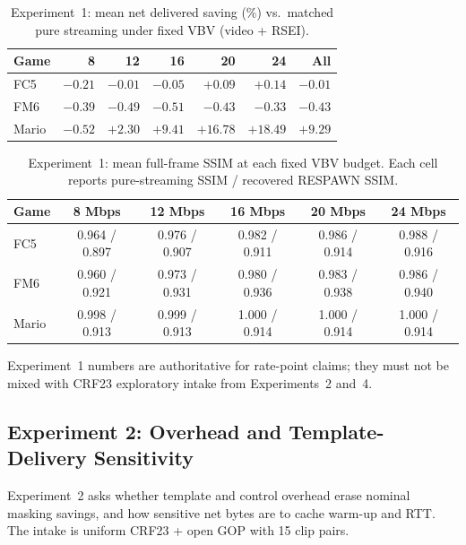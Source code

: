 \begin{table}[t]
  \centering
  \small
  \caption{Experiment~1: mean net delivered saving (\%) vs.\ matched pure streaming under fixed VBV (video + RSEI).}
  \label{tab:exp1-fixed-budget}
  \setlength{\tabcolsep}{4pt}
  \begin{tabular}{@{}lrrrrrr@{}}
    \toprule
    \textbf{Game} & \textbf{8} & \textbf{12} & \textbf{16} & \textbf{20} & \textbf{24} & \textbf{All} \\
    \midrule
    FC5  & $-0.21$ & $-0.01$ & $-0.05$ & $+0.09$ & $+0.14$ & $\mathbf{-0.01}$ \\
    FM6  & $-0.39$ & $-0.49$ & $-0.51$ & $-0.43$ & $-0.33$ & $\mathbf{-0.43}$ \\
    Mario & $-0.52$ & $+2.30$ & $+9.41$ & $+16.78$ & $+18.49$ & $\mathbf{+9.29}$ \\
    \bottomrule
  \end{tabular}
\end{table}

\begin{table}[t]
  \centering
  \small
  \caption{Experiment~1: mean full-frame SSIM at each fixed VBV budget. Each cell reports pure-streaming SSIM / recovered RESPAWN SSIM.}
  \label{tab:exp1-fixed-ssim}
  \setlength{\tabcolsep}{3pt}
  \begin{tabular}{@{}lccccc@{}}
    \toprule
    \textbf{Game} & \textbf{8 Mbps} & \textbf{12 Mbps} & \textbf{16 Mbps} & \textbf{20 Mbps} & \textbf{24 Mbps} \\
    \midrule
    FC5 & 0.964 / 0.897 & 0.976 / 0.907 & 0.982 / 0.911 & 0.986 / 0.914 & 0.988 / 0.916 \\
    FM6 & 0.960 / 0.921 & 0.973 / 0.931 & 0.980 / 0.936 & 0.983 / 0.938 & 0.986 / 0.940 \\
    Mario & 0.998 / 0.913 & 0.999 / 0.913 & 1.000 / 0.914 & 1.000 / 0.914 & 1.000 / 0.914 \\
    \bottomrule
  \end{tabular}
\end{table}

Experiment~1 numbers are authoritative for rate-point claims; they must not be mixed with CRF23 exploratory intake from Experiments~2 and~4.

\subsection{Experiment 2: Overhead and Template-Delivery Sensitivity}
\label{sec:exp2}

Experiment~2 asks whether template and control overhead erase nominal masking savings, and how sensitive net bytes are to cache warm-up and RTT.
The intake is uniform CRF23 + open GOP with 15 clip pairs.

